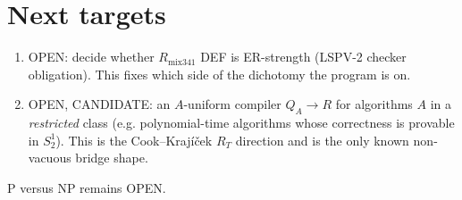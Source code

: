 \documentclass[11pt]{article}
\theoremstyle{definition}
\begin{document}
\section*{Next targets}
\begin{enumerate}
\item OPEN: decide whether $R_{\mathrm{mix341}}$ DEF is ER-strength (LSPV-2 checker obligation). This fixes which side of the dichotomy the program is on.
\item OPEN, CANDIDATE: an $A$-uniform compiler $Q_A\to R$ for algorithms $A$ in a \emph{restricted} class (e.g. polynomial-time algorithms whose correctness is provable in $S^1_2$). This is the Cook--Krajíček $R_T$ direction and is the only known non-vacuous bridge shape.
\end{enumerate}

\bigskip\noindent P versus NP remains OPEN.
\end{document}
